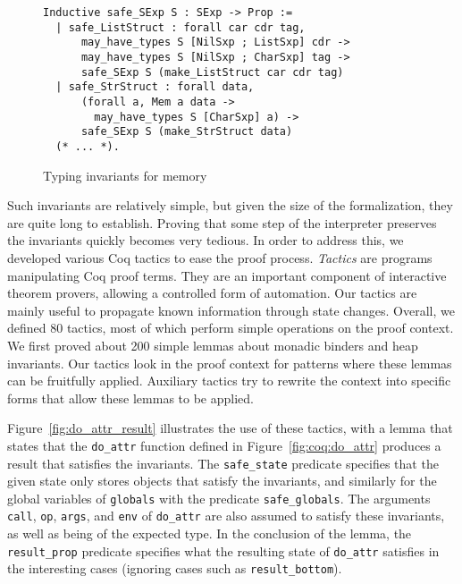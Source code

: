 \documentclass[
    sigplan,
    10pt,
    review, %
    natbib=false %
 ]{acmart}
\newcommand\et[1]{\todo[color=blue!20,size=\scriptsize]{#1}}
\newcommand\newtext[1]{{\color{blue} #1}}
\newcommand\changed[1]{{\color{blue} #1}}
\begin{document}
\begin{figure}[t]
\begin{verbatim}
Inductive safe_SExp S : SExp -> Prop :=
  | safe_ListStruct : forall car cdr tag,
      may_have_types S [NilSxp ; ListSxp] cdr ->
      may_have_types S [NilSxp ; CharSxp] tag ->
      safe_SExp S (make_ListStruct car cdr tag)
  | safe_StrStruct : forall data,
      (forall a, Mem a data ->
        may_have_types S [CharSxp] a) ->
      safe_SExp S (make_StrStruct data)
  (* ... *).
\end{verbatim}
\vspace{-1em}
    \caption{Typing invariants for memory} %
    \label{fig:invariants:definition}
\end{figure}


Such invariants are relatively simple, but given the size of the formalization,
they are quite long to establish.
Proving that some step of the interpreter preserves the invariants quickly becomes very tedious.
In order to address this, we developed various Coq tactics to ease the proof process.
\newtext{\emph{Tactics} are programs manipulating Coq proof terms. They
 are an important component of interactive theorem provers, allowing a controlled form of automation.}
Our tactics are mainly useful to propagate known information
through state changes.
\newtext{
Overall, we defined 80 tactics, most of which perform simple operations on the proof context. 
We first proved about 200 simple lemmas about monadic binders
and heap invariants.
Our tactics look in the proof context for patterns 
where these lemmas can be fruitfully applied. Auxiliary tactics 
try to rewrite the context into specific forms that allow these lemmas to be applied.}

Figure~\ref{fig:do_attr_result} illustrates the use of these tactics, with a lemma that states that the \texttt{do_attr} function
defined in Figure~\ref{fig:coq:do_attr} produces a result
that satisfies the invariants.
%
The \texttt{safe_state} predicate specifies
that the given state only stores objects that satisfy the invariants, and similarly
for the global variables of \texttt{globals} with the predicate \texttt{safe_globals}.
The arguments \texttt{call}, \texttt{op},
\texttt{args}, and \texttt{env} of \texttt{do_attr}
are also assumed to satisfy these invariants,
as well as being of the expected type.
%
\changed{In the conclusion of the lemma, the \texttt{result_prop} predicate
specifies what the resulting state of \texttt{do_attr} satisfies
in the interesting cases
(ignoring cases such as \texttt{result_bottom})}.
\end{document}
